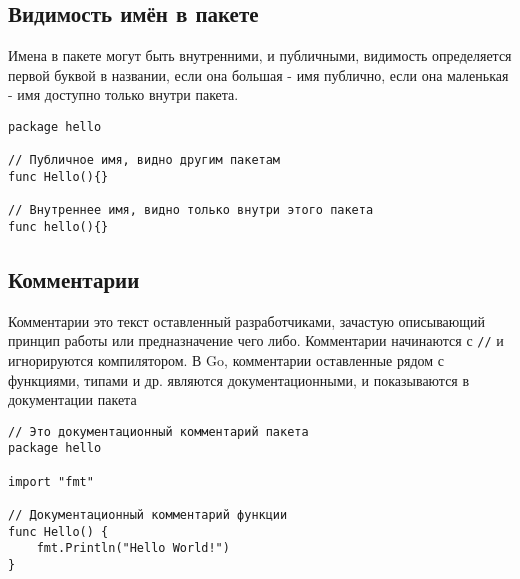 \subsection{Видимость имён в пакете}
Имена в пакете могут быть внутренними, и публичными, видимость определяется первой буквой в названии, если она большая - имя публично, если она маленькая - имя доступно только внутри пакета.
\begin{verbatim}
package hello

// Публичное имя, видно другим пакетам
func Hello(){}

// Внутреннее имя, видно только внутри этого пакета
func hello(){}
\end{verbatim}
\subsection{Комментарии}
Комментарии это текст оставленный разработчиками, зачастую описывающий принцип работы или предназначение чего либо. Комментарии начинаются с \verb|//| и игнорируются компилятором.
В Go, комментарии оставленные рядом с функциями, типами и др. являются документационными, и показываются в документации пакета
\begin{verbatim}
// Это документационный комментарий пакета
package hello

import "fmt"

// Документационный комментарий функции
func Hello() {
    fmt.Println("Hello World!")
}
\end{verbatim}
